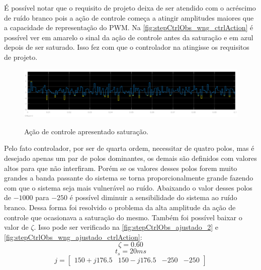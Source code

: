 \documentclass[
	article,			%
	11pt,				%
	oneside,			%
	a4paper,			%
	english,			%
	brazil,				%
	sumario=tradicional
	]{abntex2}
\begin{document}
É possível notar que o requisito de projeto deixa de ser atendido com o acréscimo de ruído branco pois a ação de controle começa a atingir amplitudes maiores que a capacidade de representação do PWM. 
Na \autoref{fig:stepCtrlObs_wng_ctrlAction} é possível ver em amarelo o sinal da ação de controle antes da saturação e em azul depois de ser saturado. Isso fez com que o controlador na atingisse os requisitos de projeto.

\begin{figure}[htb!]
	\centering
	\caption{Ação de controle apresentado saturação.}
	\includegraphics[scale=0.6]{./img/stepCtrlObs_wng_ctrlAction.png}
	\label{fig:stepCtrlObs_wng_ctrlAction}
\end{figure}

\pagebreak

Pelo fato controlador, por ser de quarta ordem, necessitar de quatro polos, mas é desejado apenas um par de polos dominantes, os demais são definidos com valores altos para que não interfiram. Porém se os valores desses polos forem muito grandes a banda passante do sistema se torna proporcionalmente grande fazendo com que o sistema seja mais vulnerável ao ruído. Abaixando o valor desses polos de $-1000$ para $-250$ é possível diminuir a sensibilidade do sistema ao ruído branco. Dessa forma foi resolvido o problema da alta amplitude da ação de controle que ocasionava a saturação do mesmo. Também foi possível baixar o valor de $\zeta$. Isso pode ser verificado na \autoref{fig:stepCtrlObs_ajustado_2} e \autoref{fig:stepCtrlObs_wng_ajustado_ctrlAction}:
$$
\zeta = 0.60
$$
$$
t_s = 20 ms
$$
$$
j=
\left[
\begin{array}{cccc}
150+j176.5 &  150-j176.5 & -250 & -250
\end{array}
\right]
$$
\end{document}
